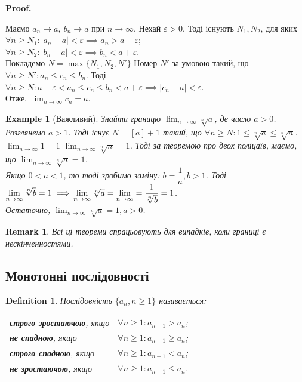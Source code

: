 \documentclass[a4paper, 14pt]{article}
\makeatletter
\def\qed{$\blacksquare$}
\theoremstyle{theoremdd}
\theoremstyle{theoremdd}
\newtheorem{definition}[theorem]{Definition}
\theoremstyle{theoremdd}
\theoremstyle{theoremdd}
\newtheorem{example}[theorem]{Example}
\theoremstyle{theoremdd}
\theoremstyle{theoremdd}
\newtheorem{remark}[theorem]{Remark}
\theoremstyle{theoremdd}
\theoremstyle{theoremdd}
\renewenvironment{proof}[1][Proof.\\]{\par
\pushQED{\hfill \qed}%
\normalfont \topsep6\p@\@plus6\p@\relax
\trivlist
\item\relax
{\bfseries
#1\@addpunct{.}}\hspace\labelsep\ignorespaces
}{%
\popQED\endtrivlist\@endpefalse
}
\makeatother
\begin{document}
	\begin{proof}
	Маємо $a_n \to a,\ b_n \to a$ при $n \to \infty$. Нехай $\varepsilon > 0$. Тоді існують $N_1,N_2$, для яких\\
	$\forall n \geq N_1: |a_n-a| < \varepsilon \implies a_n > a - \varepsilon$;\\
	$\forall n \geq N_2: |b_n-a| < \varepsilon \implies b_n<a+\varepsilon$.\\
	Покладемо $N=\max\{N_1, N_2, N'\}$ Номер $N'$ за умовою такий, що $\forall n \geq N': a_n \leq c_n \leq b_n$. Тоді \\
	$\forall n \geq N: a-\varepsilon< a_n \leq c_n \leq b_n < a+\varepsilon \implies |c_n - a|<\varepsilon$.\\
	Отже, $\displaystyle \lim_{n \to \infty} c_n = a$.
	\end{proof}
	
	\begin{example}[Важливий]
	Знайти границю $\displaystyle\lim_{n \to \infty} \sqrt[n]{a}$, де число $a>0$. \\
	Розглянемо $a > 1$. Тоді існує $N = [a]+1$ такий, що $\forall n \geq N: 1 \leq \sqrt[n]{a} \leq \sqrt[n]{n}$.\\
	$\displaystyle\lim_{n \to \infty} 1 = 1$ \quad $\displaystyle\lim_{n \to \infty} \sqrt[n]{n} = 1$. Тоді за теоремою про двох поліцаїв, маємо, що $\displaystyle\lim_{n \to \infty} \sqrt[n]{a} = 1$.\\
	Якщо $0 < a < 1$, то тоді зробимо заміну: $b = \dfrac{1}{a}, b > 1$. Тоді $\displaystyle\lim_{n \to \infty} \sqrt[n]{b} = 1 \implies \\ \displaystyle\lim_{n \to \infty} \sqrt[n]{a} = \displaystyle\lim_{n \to \infty} = \dfrac{1}{\sqrt[n]{b}} = 1$.\\
	Остаточно, $\displaystyle\lim_{n \to \infty} \sqrt[n]{a} = 1, a > 0$.
	\end{example}
	
	\begin{remark}
	Всі ці теореми спрацьовують для випадків, коли границі є нескінченностями.
	\end{remark}
	
	\subsection{Монотонні послідовності}
	\begin{definition}
	Послідовність $\{a_n, n \geq 1\}$ називається: \\
	\begin{tabular}{ll}
	\textbf{строго зростаючою}, якщо & $\forall n \geq 1: a_{n+1} > a_n$; \\
	\textbf{не спадною}, якщо & $\forall n \geq 1: a_{n+1} \geq a_n$; \\
	\textbf{строго спадною}, якщо & $\forall n \geq 1: a_{n+1} < a_n$; \\
	\textbf{не зростаючою}, якщо & $\forall n \geq 1: a_{n+1} \leq a_n$.
	\end{tabular}
	\end{definition}
	
\end{document}
